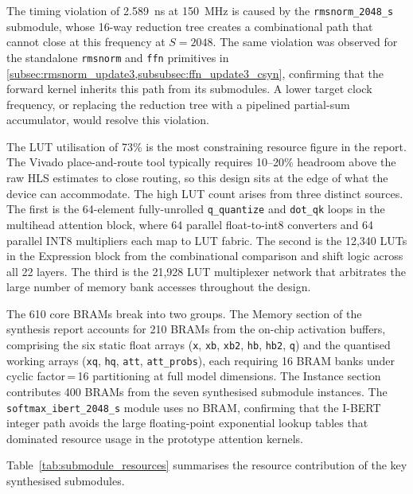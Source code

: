 The timing violation of \SI{2.589}{\nano\second} at \SI{150}{\mega\hertz} is
caused by the \texttt{rmsnorm\_2048\_s} submodule, whose 16-way reduction tree
creates a combinational path that cannot close at this frequency at $S = 2048$.
The same violation was observed for the standalone \texttt{rmsnorm} and
\texttt{ffn} primitives in \cref{subsec:rmsnorm_update3,subsubsec:ffn_update3_csyn},
confirming that the forward kernel inherits this path from its submodules.
A lower target clock frequency, or replacing the reduction tree with a
pipelined partial-sum accumulator, would resolve this violation.

The LUT utilisation of 73\% is the most constraining resource figure in the
report. The Vivado place-and-route tool typically requires 10--20\% headroom
above the raw HLS estimates to close routing, so this design sits at the edge
of what the device can accommodate. The high LUT count arises from three
distinct sources. The first is the 64-element fully-unrolled \texttt{q\_quantize}
and \texttt{dot\_qk} loops in the multihead attention block, where 64 parallel
float-to-int8 converters and 64 parallel INT8 multipliers each map to LUT
fabric. The second is the 12{,}340 LUTs in the Expression block from the
combinational comparison and shift logic across all 22 layers. The third is
the 21{,}928 LUT multiplexer network that arbitrates the large number of
memory bank accesses throughout the design.

The 610 core BRAMs break into two groups. The Memory section of the synthesis
report accounts for 210 BRAMs from the on-chip activation buffers, comprising
the six static float arrays (\texttt{x}, \texttt{xb}, \texttt{xb2}, \texttt{hb},
\texttt{hb2}, \texttt{q}) and the quantised working arrays (\texttt{xq},
\texttt{hq}, \texttt{att}, \texttt{att\_probs}), each requiring 16 BRAM banks
under cyclic factor\,=\,16 partitioning at full model dimensions. The Instance
section contributes 400 BRAMs from the seven synthesised submodule instances.
The \texttt{softmax\_ibert\_2048\_s} module uses no BRAM, confirming that the
I-BERT integer path avoids the large floating-point exponential lookup tables
that dominated resource usage in the prototype attention kernels.

Table~\ref{tab:submodule_resources} summarises the resource contribution of
the key synthesised submodules.

